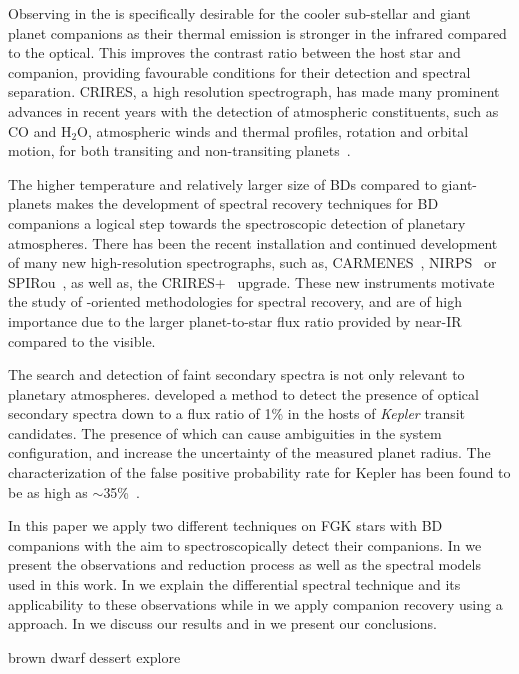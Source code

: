 Observing in the \nir{}is specifically desirable for the cooler sub-stellar and giant planet companions as their thermal emission is stronger in the infrared compared to the optical. This improves the contrast ratio between the host star and companion, providing favourable conditions for their detection and spectral separation.
CRIRES, a high resolution \nir{} spectrograph, has made many prominent advances in recent years with the detection of atmospheric constituents, such as \(\textrm{CO} \) and \(\textrm{H}_{2}\textrm{O} \), atmospheric winds and thermal profiles, rotation and orbital motion, for both transiting and non-transiting planets~\citep[e.g.][]{snellen_orbital_2010, brogi_signature_2012, rodler_weighing_2012, dekok_detection_2013, brogi_carbon_2014, snellen_fast_2014, piskorz_evidence_2016, brogi_rotation_2016, birkby_discovery_2017}.

The higher temperature and relatively larger size of BDs compared to giant-planets makes the development of spectral recovery techniques for BD companions a logical step towards the spectroscopic detection of planetary atmospheres.
There has been the recent installation and continued development of many new high-resolution \nir{}spectrographs, such as, {CARMENES}~\citep{quirrenbach_carmenes_2014}, NIRPS~\citep{bouchy_nearinfrared_2017} or SPIRou~\citep{artigau_spirou_2014}, as well as, the {CRIRES+}~\citep{dorn_crires_2016} upgrade.
These new instruments motivate the study of \nir{}-oriented methodologies for spectral recovery, and are of high importance due to the larger planet-to-star flux ratio provided by near-IR compared to the visible.

{\rd{} The search and detection of faint secondary spectra is not only relevant to planetary atmospheres.
\citet{kolbl_detection_2015} developed a method to detect the presence of optical secondary spectra down to a flux ratio of 1\% in the hosts of \emph{Kepler} transit candidates.
The presence of which can cause ambiguities in the system configuration, and increase the uncertainty of the measured planet radius.
The characterization of the false positive probability rate for Kepler has been found to be as high as \(\sim\)35\%~\citet{santerne_sophie_2012}.}

In this paper we apply two different techniques on FGK stars with BD companions with the aim to spectroscopically detect their companions.
In  we present the observations and reduction process as well as the spectral models used in this work.
In  we explain the differential spectral technique and its applicability to these observations while in  we apply companion recovery using a \textchisquared{} approach.
In  we discuss our results and in  we present our conclusions.



brown dwarf dessert explore \citet{ranc_moa2007blg197_2015}


